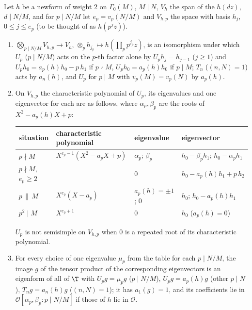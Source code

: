 \begin{lemma}\label{lem:modgalrep:Up-oldspace}
Let $h$ be a newform of weight $2$ on $\Gamma_0(M)$, $M\mid N$, $V_h$ the span of the $h(dz)$, $d\mid N/M$, and for $p\mid N/M$ let $e_p=v_p(N/M)$ and $V_{h,p}$ the space with
basis $h_j$, $0\le j\le e_p$ (to be thought of as $h(p^jz)$).
\begin{enumerate}[label=(\roman*)]
\item $\bigotimes_{p\mid N/M}V_{h,p}\to V_h$, $\otimes_ph_{j_p}\mapsto h(\prod_pp^{j_p}z)$, is an isomorphism under which $U_p$ ($p\mid N/M$) acts on the $p$-th factor alone by $U_ph_j=h_{j-1}$
($j\ge1$) and $U_ph_0=a_p(h)h_0-p\,h_1$ if $p\nmid M$, $U_ph_0=a_p(h)h_0$ if $p\mid M$; $T_n$ ($(n,N)=1$) acts by $a_n(h)$, and $U_p$ for $p\mid M$ with $v_p(M)=v_p(N)$ by $a_p(h)$.
\item On $V_{h,p}$ the characteristic polynomial of $U_p$, its eigenvalues and one eigenvector for each are as follows, where $\alpha_p,\beta_p$ are the roots of
$X^2-a_p(h)X+p$:
\begin{center}\small
\begin{tabular}{@{}llll@{}}
\toprule
situation & characteristic polynomial & eigenvalue & eigenvector\\
\midrule
$p\nmid M$ & $X^{e_p-1}(X^2-a_pX+p)$ & $\alpha_p$; $\beta_p$ & $h_0-\beta_ph_1$; $h_0-\alpha_ph_1$\\
$p\nmid M$, $e_p\ge2$ & & $0$ & $h_0-a_p(h)h_1+p\,h_2$\\
$p\,\|\,M$ & $X^{e_p}(X-a_p)$ & $a_p(h)=\pm1$; $0$ & $h_0$; $h_0-a_p(h)h_1$\\
$p^2\mid M$ & $X^{e_p+1}$ & $0$ & $h_0$ ($a_p(h)=0$)\\
\bottomrule
\end{tabular}
\end{center}
$U_p$ is not semisimple on $V_{h,p}$ when $0$ is a repeated root of its characteristic polynomial.
\item For every choice of one eigenvalue $\mu_p$ from the table for each $p\mid N/M$, the image $g$ of the tensor product of the corresponding eigenvectors is
an eigenform of all of $\T$ with $U_pg=\mu_pg$ ($p\mid N/M$), $U_pg=a_p(h)g$ (other $p\mid N$), $T_ng=a_n(h)g$ ($(n,N)=1$); it has $a_1(g)=1$, and its coefficients lie in
$\mathcal{O}[\alpha_p,\beta_p:p\mid N/M]$ if those of $h$ lie in $\mathcal{O}$.
\end{enumerate}
\end{lemma}

